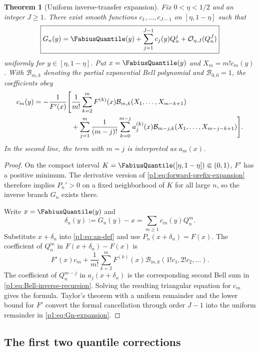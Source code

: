 \documentclass[11pt,oneside]{article}
\numberwithin{equation}{section}
\newtheorem{theorem}{Theorem}[section]
\theoremstyle{definition}
\theoremstyle{remark}
\newcommand{\Fn}{P_n}
\newcommand{\Gn}{G_n}
\begin{document}
\begin{theorem}[Uniform inverse-transfer expansion]
\label{p1:thm:inverse-transfer}
Fix $0<\eta<1/2$ and an integer $J\ge1$.  There exist smooth functions
$c_1,\ldots,c_{J-1}$ on $[\eta,1-\eta]$ such that
\begin{equation}
 \boxed{
 \Gn(y)=\FabiusQuantile(y)+\sum_{j=1}^{J-1}c_j(y)Q_n^j
 +\BigO_{\eta,J}(Q_n^J)}
 \label{p1:eq:Gn-expansion}
\end{equation}
uniformly for $y\in[\eta,1-\eta]$.  Put $x=\FabiusQuantile(y)$ and
$X_m=m!c_m(y)$.  With $\mathcal B_{m,k}$ denoting the partial exponential Bell
polynomial and $\mathcal B_{0,0}=1$, the coefficients obey
\begin{align}
 c_m(y)=-\frac1{F'(x)}\Bigg[&
 \frac1{m!}\sum_{k=2}^{m}F^{(k)}(x)
 \mathcal B_{m,k}(X_1,\ldots,X_{m-k+1})
 \notag\\
 &+\sum_{j=1}^{m}\frac1{(m-j)!}
 \sum_{k=0}^{m-j}a_j^{(k)}(x)
 \mathcal B_{m-j,k}(X_1,\ldots,X_{m-j-k+1})
 \Bigg].
 \label{p1:eq:Bell-inverse-recursion}
\end{align}
In the second line, the term with $m=j$ is interpreted as $a_m(x)$.
\end{theorem}

\begin{proof}
On the compact interval $K=\FabiusQuantile([\eta,1-\eta])\Subset(0,1)$, $F'$ has a
positive minimum.  The derivative version of \eqref{p1:eq:forward-prefix-expansion}
therefore implies $\Fn'>0$ on a fixed neighborhood of $K$ for all large $n$,
so the inverse branch $\Gn$ exists there.

Write $x=\FabiusQuantile(y)$ and
\[
 \delta_n(y):=\Gn(y)-x=\sum_{m\ge1}c_m(y)Q_n^m.
\]
Substitute $x+\delta_n$ into \eqref{p1:eq:an-def} and use
$\Fn(x+\delta_n)=F(x)$.  The coefficient of $Q_n^m$ in
$F(x+\delta_n)-F(x)$ is
\[
 F'(x)c_m+\frac1{m!}\sum_{k=2}^{m}F^{(k)}(x)
 \mathcal B_{m,k}(1!c_1,2!c_2,\ldots).
\]
The coefficient of $Q_n^{m-j}$ in $a_j(x+\delta_n)$ is the corresponding
second Bell sum in \eqref{p1:eq:Bell-inverse-recursion}.  Solving the resulting
triangular equation for $c_m$ gives the formula.  Taylor's theorem with a
uniform remainder and the lower bound for $F'$ convert the formal cancellation
through order $J-1$ into the uniform remainder in \eqref{p1:eq:Gn-expansion}.
\end{proof}

\subsection{The first two quantile corrections}
\end{document}
